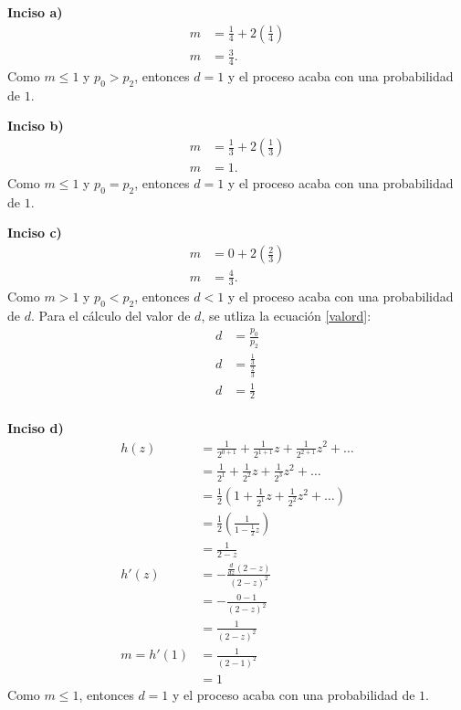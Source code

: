 \documentclass{article}
\begin{document}
\noindent \textbf{Inciso a)}
\begin{align}
    \nonumber
        m & = \frac{1}{4} + 2\left(\frac{1}{4}\right) \\ \nonumber
        m & = \frac{3}{4}. \nonumber
\end{align}
Como $m \leq 1$ y $p_{0} > p_{2}$, entonces $d=1$ y el proceso acaba con una probabilidad de $1$.

\noindent \textbf{Inciso b)}
\begin{align}
    \nonumber
        m & = \frac{1}{3} + 2\left(\frac{1}{3}\right) \\ \nonumber
        m & = 1. \nonumber
\end{align}
Como $m \leq 1$ y $p_{0} = p_{2}$, entonces $d=1$ y el proceso acaba con una probabilidad de $1$.

\noindent \textbf{Inciso c)}
\begin{align}
    \nonumber
        m & = 0 + 2\left(\frac{2}{3}\right) \\ \nonumber
        m & = \frac{4}{3}. \nonumber
\end{align}
Como $m > 1$ y $p_{0} < p_{2}$, entonces $d<1$ y el proceso acaba con una probabilidad de $d$. Para el cálculo del valor de $d$, se utliza la ecuación \ref{valord}:
\begin{align} \label{valord}
        d & = \frac{p_{0}}{p_{2}}\\ \nonumber
        d & = \frac{\frac{1}{3}}{\frac{2}{3}}\\ \nonumber
        d & = \frac{1}{2} \\ \nonumber
\end{align}

\noindent \textbf{Inciso d)}
\begin{align}
    \nonumber
        h(z)        & = \frac{1}{2^{0+1}} + \frac{1}{2^{1+1}}z + \frac{1}{2^{2+1}}z^2 + \dots \\ \nonumber
                    & = \frac{1}{2^{1}} + \frac{1}{2^{2}}z + \frac{1}{2^{3}}z^2 + \dots \\ \nonumber
                    & = \frac{1}{2} \left(1 + \frac{1}{2^{1}}z + \frac{1}{2^{2}}z^2 + \dots \right)\\ \nonumber
                    & = \frac{1}{2} \left(\frac{1}{1-\frac{1}{2}z} \right)\\ \nonumber
                    & = \frac{1}{2-z} \\ \nonumber
        h'(z)       & = -\frac{\frac{d}{dz}(2-z)}{(2-z)^2} \\ \nonumber
                    & =-\frac{0-1}{(2-z)^2} \\ \nonumber
                    & =\frac{1}{(2-z)^2} \\ \nonumber
        m = h'(1)   & = \frac{1}{(2-1)^2}  \\ \nonumber
                    & = 1 \nonumber
\end{align}
Como $m \leq 1$, entonces $d=1$ y el proceso acaba con una probabilidad de $1$.
\end{document}
